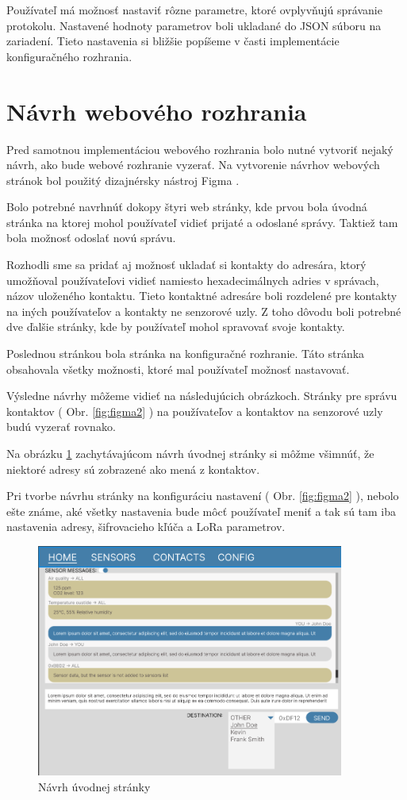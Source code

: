 \documentclass[slovak,master]{diploma}
\begin{document}
Používateľ má možnosť nastaviť rôzne parametre, ktoré ovplyvňujú správanie protokolu. Nastavené hodnoty parametrov boli ukladané do 
JSON súboru na zariadení. Tieto nastavenia si bližšie popíšeme v časti implementácie 
konfiguračného rozhrania.

\section{Návrh webového rozhrania}
Pred samotnou implementáciou webového rozhrania bolo nutné vytvoriť nejaký návrh, 
ako bude webové rozhranie vyzerať. Na vytvorenie návrhov webových stránok bol použitý dizajnérsky nástroj Figma \cite{figma}.

Bolo potrebné navrhnúť dokopy štyri web stránky, kde prvou bola úvodná stránka na ktorej mohol používateľ vidieť prijaté a odoslané správy. 
Taktiež tam bola možnosť odoslať novú správu.

Rozhodli sme sa pridať aj možnosť ukladať si kontakty do adresára, ktorý umožňoval používateľovi vidieť namiesto 
hexadecimálnych adries v správach, názov uloženého kontaktu. Tieto kontaktné adresáre boli rozdelené pre kontakty na iných používateľov a kontakty 
ne senzorové uzly. Z toho dôvodu boli potrebné dve ďalšie stránky, kde by používateľ mohol spravovať svoje kontakty.

Poslednou stránkou bola stránka na konfiguračné rozhranie. Táto stránka obsahovala všetky možnosti, ktoré mal používateľ možnosť nastavovať.

Výsledne návrhy môžeme vidieť na následujúcich obrázkoch. Stránky pre správu kontaktov ( Obr. \ref{fig:figma2} ) na používateľov a kontaktov na senzorové uzly budú vyzerať 
rovnako.

Na obrázku \ref{fig:figmaHome} zachytávajúcom návrh úvodnej stránky si môžme všimnúť, že niektoré adresy sú zobrazené ako mená z kontaktov.

Pri tvorbe návrhu stránky na konfiguráciu nastavení ( Obr. \ref{fig:figma2} ), nebolo ešte známe, aké všetky nastavenia 
bude môcť používateľ meniť a tak sú tam iba nastavenia adresy, šifrovacieho kľúča a LoRa parametrov.
\newpage

\begin{figure}[h!]
  \centering
  \includegraphics[width=0.9\textwidth]{Figures/figmaHome.png}
  \caption{Návrh úvodnej stránky}
  \label{fig:figmaHome}
\end{figure}
\end{document}
